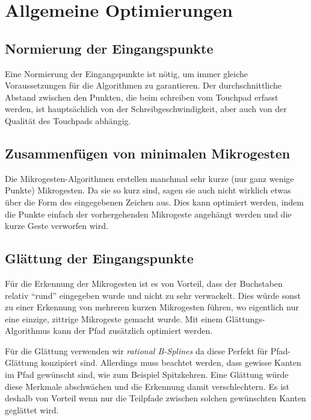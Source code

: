 
\section{Allgemeine Optimierungen}

\subsection{Normierung der Eingangspunkte}
Eine Normierung der Eingangspunkte ist nötig, um immer gleiche Voraussetzungen für die Algorithmen zu garantieren. Der durchschnittliche Abstand zwischen den Punkten, die beim schreiben vom Touchpad erfasst werden, ist hauptsächlich von der Schreibgeschwindigkeit, aber auch von der Qualität des Touchpads abhängig. 



\subsection{Zusammenfügen von minimalen Mikrogesten}
Die Mikrogesten-Algorithmen erstellen manchmal sehr kurze (nur ganz wenige Punkte) Mikrogesten. Da sie so kurz sind, sagen sie auch nicht wirklich etwas über die Form des eingegebenen Zeichen aus. Dies kann optimiert werden, indem die Punkte einfach der vorhergehenden Mikrogeste angehängt werden und die kurze Geste verworfen wird.

\subsection{Glättung der Eingangspunkte}\label{sec:Glaettung}
Für die Erkennung der Mikrogesten ist es von Vorteil, dass der Buchstaben relativ ``rund'' eingegeben wurde und nicht zu sehr verwackelt. Dies würde sonst zu einer Erkennung von mehreren kurzen Mikrogesten führen, wo eigentlich nur eine einzige, zittrige Mikrogeste gemacht wurde. Mit einem Glättungs-Algorithmus kann der Pfad zusätzlich optimiert werden. 

Für die Glättung verwenden wir \emph{rational B-Splines} \cite[S. 454]{smoothing_book} da diese Perfekt für Pfad-Glättung konzipiert sind. Allerdings muss beachtet werden, dass gewisse Kanten im Pfad gewünscht sind, wie zum Beispiel Spitzkehren. Eine Glättung würde diese Merkmale abschwächen und die Erkennung damit verschlechtern. Es ist deshalb von Vorteil wenn nur die Teilpfade zwischen solchen gewünschten Kanten geglättet wird.

